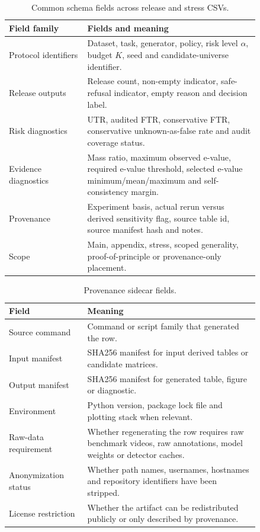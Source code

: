 \documentclass[11pt]{article}
\begin{document}
\begin{table}[h]
\centering
\caption{Common schema fields across release and stress CSVs.}
\small
\begin{tabular}{p{0.26\linewidth}p{0.58\linewidth}}
\toprule
Field family & Fields and meaning \\
\midrule
Protocol identifiers & Dataset, task, generator, policy, risk level \(\alpha\), budget \(K\), seed and candidate-universe identifier. \\
Release outputs & Release count, non-empty indicator, safe-refusal indicator, empty reason and decision label. \\
Risk diagnostics & UTR, audited FTR, conservative FTR, conservative unknown-as-false rate and audit coverage status. \\
Evidence diagnostics & Mass ratio, maximum observed e-value, required e-value threshold, selected e-value minimum/mean/maximum and self-consistency margin. \\
Provenance & Experiment basis, actual rerun versus derived sensitivity flag, source table id, source manifest hash and notes. \\
Scope & Main, appendix, stress, scoped generality, proof-of-principle or provenance-only placement. \\
\bottomrule
\end{tabular}
\end{table}

\begin{table}[h]
\centering
\caption{Provenance sidecar fields.}
\small
\begin{tabular}{p{0.26\linewidth}p{0.58\linewidth}}
\toprule
Field & Meaning \\
\midrule
Source command & Command or script family that generated the row. \\
Input manifest & SHA256 manifest for input derived tables or candidate matrices. \\
Output manifest & SHA256 manifest for generated table, figure or diagnostic. \\
Environment & Python version, package lock file and plotting stack when relevant. \\
Raw-data requirement & Whether regenerating the row requires raw benchmark videos, raw annotations, model weights or detector caches. \\
Anonymization status & Whether path names, usernames, hostnames and repository identifiers have been stripped. \\
License restriction & Whether the artifact can be redistributed publicly or only described by provenance. \\
\bottomrule
\end{tabular}
\end{table}
\end{document}
